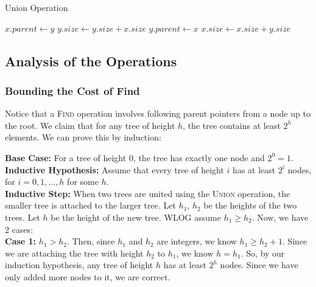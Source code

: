 \documentclass[a4paper]{article}
\begin{document}
\begin{algorithm}
\caption{Union Operation}
\begin{algorithmic}[1]
    \vspace{2mm}
        \State \Return {}
    \EndIf

    \vspace{2mm}
     
        \State $x.parent \gets y$
        \State $y.size \gets y.size + x.size$
    \Else
        \State $y.parent \gets x$
        \State $x.size \gets x.size + y.size$
    \EndIf
\EndFunction
\end{algorithmic}
\end{algorithm}

\newpage
\subsection*{Analysis of the Operations}

\subsubsection*{Bounding the Cost of Find}
Notice that a \textsc{Find} operation involves following parent pointers from a node up to the root. We claim that for any tree of height $h$, the tree contains at least $2^h$ elements. We can prove this by induction:

\medskip
\noindent \textbf{Base Case:} For a tree of height $0$, the tree has exactly one node and $2^0 = 1$.\\

\noindent \textbf{Inductive Hypothesis:} Assume that every tree of height $i$ has at least $2^i$ nodes, for $i = 0, 1, ..., h$ for some $h$.\\

\noindent \textbf{Inductive Step:} When two trees are united using the \textsc{Union} operation, the smaller tree is attached to the larger tree. Let $h_1$, $h_2$ be the heights of the two trees. Let $h$ be the height of the new tree. WLOG assume $h_1 \geq h_2$. Now, we have 2 cases: \\

\noindent \textbf{Case 1:} $h_1 > h_2$. Then, since $h_1$ and $h_2$ are integers, we know $h_1 \geq h_2 + 1$. Since we are attaching the tree with height $h_2$ to $h_1$, we know $h = h_1$. So, by our induction hypothesis, any tree of height $h$ has at least $2^{h}$ nodes. Since we have only added more nodes to it, we are correct. \\
\end{document}
